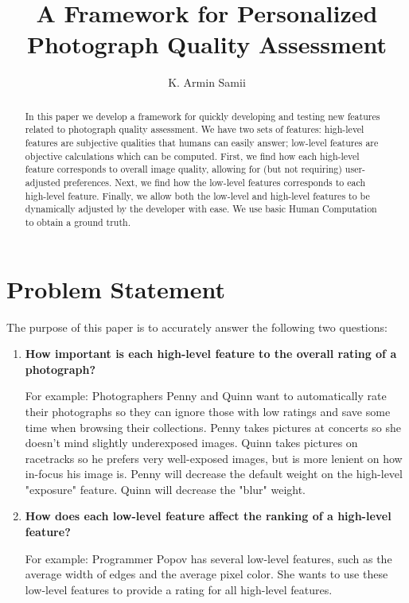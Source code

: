 \documentclass[10pt,twocolumn]{article}
\title{A Framework for Personalized Photograph Quality Assessment}
\author{K. Armin Samii}
\begin{document}
\maketitle
\begin{abstract}
In this paper we develop a framework for quickly developing and testing new features related to photograph quality assessment. We have two sets of features: high-level features are subjective qualities that humans can easily answer; low-level features are objective calculations which can be computed. First, we find how each high-level feature corresponds to overall image quality, allowing for (but not requiring) user-adjusted preferences. Next, we find how the low-level features corresponds to each high-level feature. Finally, we allow both the low-level and high-level features to be dynamically adjusted by the developer with ease. We use basic Human Computation to obtain a ground truth.


\end{abstract}

\section{Problem Statement}
The purpose of this paper is to accurately answer the following two questions:

\begin{enumerate}
\item \textbf{How important is each high-level feature to the overall rating of a photograph?}

For example:
Photographers Penny and Quinn want to automatically rate their photographs so they can ignore those with low ratings and save some time when browsing their collections. Penny takes pictures at concerts so she doesn't mind slightly underexposed images. Quinn takes pictures on racetracks so he prefers very well-exposed images, but is more lenient on how in-focus his image is. Penny will decrease the default weight on the high-level "exposure" feature. Quinn will decrease the "blur" weight.

\item \textbf{How does each low-level feature affect the ranking of a high-level feature?}

For example:
Programmer Popov has several low-level features, such as the average width of edges and the average pixel color. She wants to use these low-level features to provide a rating for all high-level features.
\end{enumerate}
\end{document}
